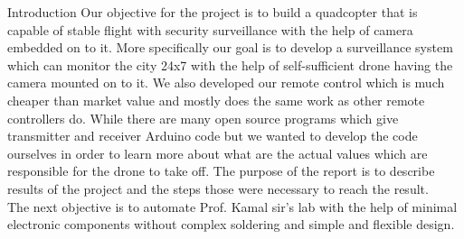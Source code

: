 \documentclass[12pt, oneside]{report}
\numberwithin{equation}{section}
\begin{document}
\vspace{1cm}



\noindent 
\tableofcontents

\newpage
{}

\begin{chapter}{Introduction}
Our objective for the project is to build a quadcopter that is capable of stable flight with security surveillance with the help of camera embedded on to it. More specifically our goal is to develop a surveillance system which can monitor the city 24x7 with the help of self-sufficient drone having the camera mounted on to it. We also developed our remote control which is much cheaper than market value and mostly does the same work as other remote controllers do. While there are many open source programs which give transmitter and receiver Arduino code but we wanted to develop the code ourselves in order to learn more about what are the actual values which are responsible for the drone to take off. The purpose of the report is to describe results of the project and the steps those were necessary to reach the result.\\
The next objective is to automate Prof. Kamal sir's lab with the help of minimal electronic components without complex soldering and simple and flexible design.

\end{chapter}
\end{document}
